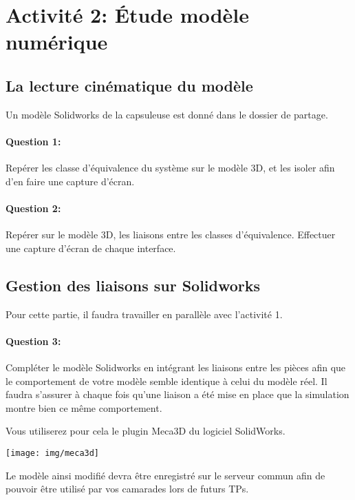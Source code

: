 \section{Activité 2: Étude modèle numérique}

\subsection{La lecture cinématique du modèle}

Un modèle Solidworks de la capsuleuse est donné dans le dossier de partage.

\paragraph{Question 1:} Repérer les classe d'équivalence du système sur le modèle 3D, et les isoler afin d'en faire une capture d'écran.

\paragraph{Question 2:} Repérer sur le modèle 3D, les liaisons entre les classes d'équivalence. Effectuer une capture d'écran de chaque interface.

\subsection{Gestion des liaisons sur Solidworks}

Pour cette partie, il faudra travailler en parallèle avec l'activité 1.

\paragraph{Question 3:} Compléter le modèle Solidworks en intégrant les liaisons entre les pièces afin que le comportement de votre modèle semble identique à celui du modèle réel. Il faudra s'assurer à chaque fois qu'une liaison a été mise en place que la simulation montre bien ce même comportement.

\begin{minipage}{0.45\linewidth}
Vous utiliserez pour cela le plugin Meca3D du logiciel SolidWorks.
\end{minipage}
\hfill
\begin{minipage}{0.5\linewidth}
\texttt{[image: img/meca3d]}
\end{minipage}

Le modèle ainsi modifié devra être enregistré sur le serveur commun afin de pouvoir être utilisé par vos camarades lors de futurs TPs.

